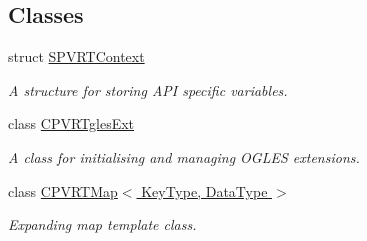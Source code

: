 \subsection*{Classes}
\begin{DoxyCompactItemize}
\item 
struct \hyperlink{struct_s_p_v_r_t_context}{S\+P\+V\+R\+T\+Context}
\begin{DoxyCompactList}\small\item\em A structure for storing A\+P\+I specific variables. \end{DoxyCompactList}\item 
class \hyperlink{class_c_p_v_r_tgles_ext}{C\+P\+V\+R\+Tgles\+Ext}
\begin{DoxyCompactList}\small\item\em A class for initialising and managing O\+G\+L\+E\+S extensions. \end{DoxyCompactList}\item 
class \hyperlink{singleton_c_p_v_r_t_map}{C\+P\+V\+R\+T\+Map$<$ Key\+Type, Data\+Type $>$}
\begin{DoxyCompactList}\small\item\em Expanding map template class. \end{DoxyCompactList}\end{DoxyCompactItemize}
